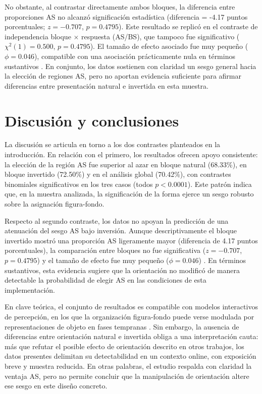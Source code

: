 \documentclass[stu, 12pt, letterpaper, donotrepeattitle, floatsintext, natbib]{apa7}
\begin{document}
No obstante, al contrastar directamente ambos bloques, la diferencia entre proporciones AS no alcanzó significación estadística (diferencia = -4.17 puntos porcentuales; \(z=-0.707\), \(p=0.4795\)). Este resultado se replicó en el contraste de independencia bloque \(\times\) respuesta (AS/BS), que tampoco fue significativo (\(\chi^2(1)=0.500\), \(p=0.4795\)). El tamaño de efecto asociado fue muy pequeño (\(\phi=0.046\)), compatible con una asociación prácticamente nula en términos sustantivos \citep{cohen1988power}. En conjunto, los datos sostienen con claridad un sesgo general hacia la elección de regiones AS, pero no aportan evidencia suficiente para afirmar diferencias entre presentación natural e invertida en esta muestra.

\section{Discusión y conclusiones}

La discusión se articula en torno a los dos contrastes planteados en la introducción. En relación con el primero, los resultados ofrecen apoyo consistente: la elección de la región AS fue superior al azar en bloque natural (68.33\%), en bloque invertido (72.50\%) y en el análisis global (70.42\%), con contrastes binomiales significativos en los tres casos (todos \(p<0.0001\)). Este patrón indica que, en la muestra analizada, la significación de la forma ejerce un sesgo robusto sobre la asignación figura-fondo.

Respecto al segundo contraste, los datos no apoyan la predicción de una atenuación del sesgo AS bajo inversión. Aunque descriptivamente el bloque invertido mostró una proporción AS ligeramente mayor (diferencia de 4.17 puntos porcentuales), la comparación entre bloques no fue significativa (\(z=-0.707\), \(p=0.4795\)) y el tamaño de efecto fue muy pequeño (\(\phi=0.046\)) \citep{cohen1988power}. En términos sustantivos, esta evidencia sugiere que la orientación no modificó de manera detectable la probabilidad de elegir AS en las condiciones de esta implementación.

En clave teórica, el conjunto de resultados es compatible con modelos interactivos de percepción, en los que la organización figura-fondo puede verse modulada por representaciones de objeto en fases tempranas \citep{peterson1994must,peterson1994object,vecera1998interactive}. Sin embargo, la ausencia de diferencias entre orientación natural e invertida obliga a una interpretación cauta: más que refutar el posible efecto de orientación descrito en otros trabajos, los datos presentes delimitan su detectabilidad en un contexto online, con exposición breve y muestra reducida. En otras palabras, el estudio respalda con claridad la ventaja AS, pero no permite concluir que la manipulación de orientación altere ese sesgo en este diseño concreto.
\end{document}
